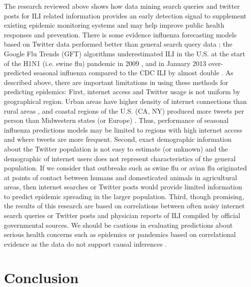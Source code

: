 \documentclass[sigconf]{acmart}
\begin{document}
The research reviewed above shows how data mining search queries and twitter posts for 
ILI related information provides an early detection signal to supplement existing epidemic 
monitoring systems and may help improve public health responses and prevention. There is 
some evidence influenza forecasting models based on Twitter data performed better than 
general search query data \cite{paul14}; the Google Flu Trends (GFT) algorithms 
underestimated ILI in the U.S. at the start of the H1N1 (i.e. swine flu) pandemic in 
2009 \cite{butler13}, and in January 2013 over-predicted seasonal influenza compared to 
the CDC ILI by almost double \cite{lazer14}. As described above, there are important 
limitations in using these methods for predicting epidemics: First, internet access and 
Twitter usage is not uniform by geographical region. Urban areas have higher density of 
internet connections than rural areas \cite{yuan13}, and coastal regions of the U.S. 
(CA, NY) produced more tweets per person than Midwestern states (or Europe) 
\cite{achrekar12}. Thus, performance of seasonal influenza predictions models may be 
limited to regions with high internet access and where tweets are more frequent. Second, 
exact demographic information about the Twitter population is not easy to estimate (or 
unknown) and the demographic of internet users does not represent characteristics of the 
general population. If we consider that outbreaks such as swine flu or avian flu originated 
at points of contact between humans and domesticated animals in agricultural areas, then 
internet searches or Twitter posts would provide limited information to predict epidemic 
spreading in the larger population. Third, though promising, the results of this research 
are based on correlations between often noisy internet search queries or Twitter posts and 
physician reports of ILI compiled by official governmental sources. We should be cautious 
in evaluating predictions about serious health concerns such as epidemics or pandemics 
based on correlational evidence as the data do not support causal inferences . 

\section{Conclusion}
\end{document}
